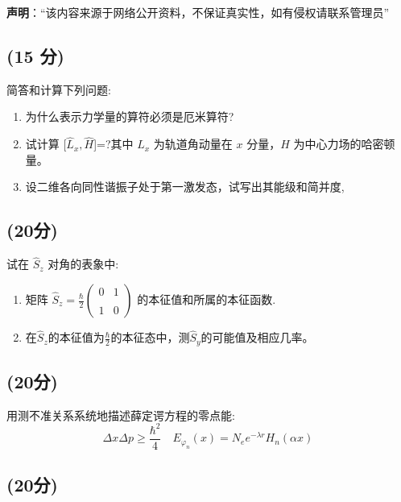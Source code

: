 
\textbf{声明}：“该内容来源于网络公开资料，不保证真实性，如有侵权请联系管理员”

\subsection{(15 分)}
简答和计算下列问题:
\begin{enumerate}
    \item 为什么表示力学量的算符必须是厄米算符?
    \item 试计算 [$\hat{L}_x ,\hat{H}$]=?其中 $\hat{L}_x$ 为轨道角动量在 $x$ 分量，$\hat{H}$ 为中心力场的哈密顿量。
    \item 设二维各向同性谐振子处于第一激发态，试写出其能级和简并度,
\end{enumerate}
\subsection{(20分)}
试在 $\hat{S}_z$ 对角的表象中:
\begin{enumerate}
    \item 矩阵 $\hat{S}_z = \frac{\hbar}{2}\begin{pmatrix} 0 & 1 \\\\ 1 & 0 \end{pmatrix}$ 的本征值和所属的本征函数.
    \item 在$\hat{S}_z$的本征值为$\frac{\hbar}{2}$的本征态中，测$\hat{S}_y$的可能值及相应几率。
\end{enumerate}
\subsection{(20分)}
用测不准关系系统地描述薛定谔方程的零点能:
\[\Delta x \Delta p \geq \frac{\hbar^2}{4} \quad E_{\varphi_n}(x) = N_e e^{- \lambda r} H_n (\alpha x)~\]
\subsection{(20分)}

